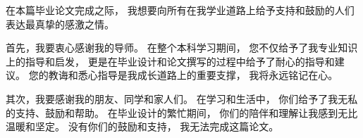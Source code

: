 \begin{acknowledgement}

在本篇毕业论文完成之际，
我想要向所有在我学业道路上给予支持和鼓励的人们
表达最真挚的感激之情。

首先，我要衷心感谢我的导师。
在整个本科学习期间，
您不仅给予了我专业知识上的指导和启发，
更是在毕业设计和论文撰写的过程中给予了耐心的指导和建议。
您的教诲和悉心指导是我成长道路上的重要支撑，
我将永远铭记在心。

其次，我要感谢我的朋友、同学和家人们。
在学习和生活中，
你们给予了我无私的支持、鼓励和帮助。
在毕业设计的繁忙期间，
你们的陪伴和理解让我感到无比温暖和坚定。
没有你们的鼓励和支持，
我无法完成这篇论文。

\end{acknowledgement}